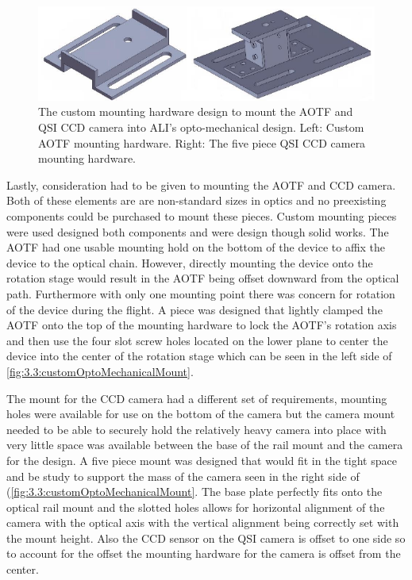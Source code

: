 \begin{figure}[h!]
        \includegraphics[width=1.0\textwidth]{./Images/3-3-CustomMountingPieces.pdf}
        \caption[ALI Custom Mounting Hardware]{The custom mounting hardware design to mount the AOTF and QSI CCD camera into ALI's opto-mechanical design. Left: Custom AOTF mounting hardware. Right: The five piece QSI CCD camera mounting hardware.}
        \label{fig:3.3:customOptoMechanicalMount}
\end{figure}

Lastly, consideration had to be given to mounting the AOTF and CCD camera. Both of these elements are are non-standard sizes in optics and no preexisting components could be purchased to mount these pieces. Custom mounting pieces were used designed both components and were design though solid works. The AOTF had one usable mounting hold on the bottom of the device to affix the device to the optical chain. However, directly mounting the device onto the rotation stage would result in the AOTF being offset downward from the optical path. Furthermore with only one mounting point there was concern for rotation of the device during the flight. A piece was designed that lightly clamped the AOTF onto the top of the mounting hardware to lock the AOTF's rotation axis and then use the four slot screw holes located on the lower plane to center the device into the center of the rotation stage which can be seen in the left side of \autoref{fig:3.3:customOptoMechanicalMount}.
 
The mount for the CCD camera had a different set of requirements, mounting holes were available for use on the bottom of the camera but the camera mount needed to be able to securely hold the relatively heavy camera into place with very little space was available between the base of the rail mount and the camera for the design. A five piece mount was designed that would fit in the tight space and be study to support the mass of the camera seen in the right side of (\autoref{fig:3.3:customOptoMechanicalMount}. The base plate perfectly fits onto the optical rail mount and the slotted holes allows for horizontal alignment of the camera with the optical axis with the vertical alignment being correctly set with the mount height. Also the CCD sensor on the QSI camera is offset to one side so to account for the offset the mounting hardware for the camera is offset from the center.


